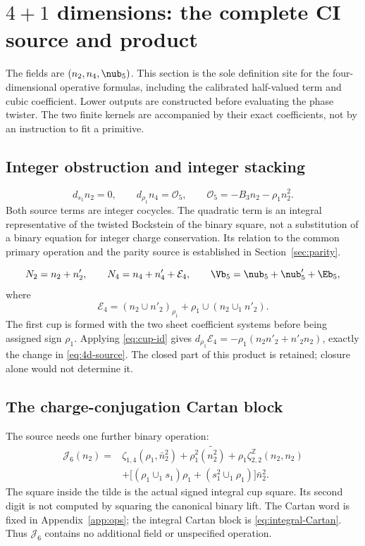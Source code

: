 \section{\texorpdfstring{$4+1$}{4+1} dimensions: the complete CI source and product}\label{sec:4d}
The fields are $(n_2,n_4,\nub_5)$. This section is the sole definition site for the four-dimensional operative formulas, including the calibrated half-valued term and cubic coefficient. Lower outputs are constructed before evaluating the phase twister. The two finite kernels are accompanied by their exact coefficients, not by an instruction to fit a primitive.

\subsection{Integer obstruction and integer stacking}
\begin{equation}\label{eq:4d-source}
 \boxed{d_{s_1}n_2=0,\qquad d_{\rho_1}n_4=\mathcal O_5,
 \qquad\mathcal O_5=-B_3n_2-\rho_1 n_2^2.}
\end{equation}
Both source terms are integer cocycles. The quadratic term is an integral representative of the twisted Bockstein of the binary square, not a substitution of a binary equation for integer charge conservation. Its relation to the common primary operation and the parity source is established in Section~\ref{sec:parity}.

\begin{equation}\label{eq:4d-output}
 N_2=n_2+n'_2,\qquad N_4=n_4+n'_4+\mathcal E_4,
 \qquad \Vb_5=\nub_5+\nub'_5+\Eb_5,
\end{equation}
where
\begin{equation}\label{eq:4d-E4}
 \boxed{\mathcal E_4=(n_2\cup n'_2)_{\rho_1}
                   +\rho_1\cup(n_2\cup_1 n'_2).}
\end{equation}
The first cup is formed with the two sheet coefficient systems before being assigned sign $\rho_1$. Applying \eqref{eq:cup-id} gives
$d_{\rho_1}\mathcal E_4=-\rho_1(n_2n'_2+n'_2n_2)$, exactly the change in \eqref{eq:4d-source}. The closed part of this product is retained; closure alone would not determine it.

\subsection{The charge-conjugation Cartan block}
The source needs one further binary operation:
\begin{equation}\label{eq:J6}
 \boxed{\begin{aligned}
 \mathcal J_6(n_2)={}&
 \zeta_{1,4}(\rho_1,\bar n_2^2)
 +\rho_1^2\widetilde{(n_2^2)}
 +\rho_1\zeta^{\mathbb Z}_{2,2}(n_2,n_2)\\
 &+\big[(\rho_1\cup_1s_1)\rho_1
             +(s_1^2\cup_1\rho_1)\big]\bar n_2^2.
 \end{aligned}}
\end{equation}
The square inside the tilde is the actual signed integral cup square. Its second digit is not computed by squaring the canonical binary lift. The Cartan word is fixed in Appendix~\ref{app:ops}; the integral Cartan block is \eqref{eq:integral-Cartan}. Thus $\mathcal J_6$ contains no additional field or unspecified operation.

